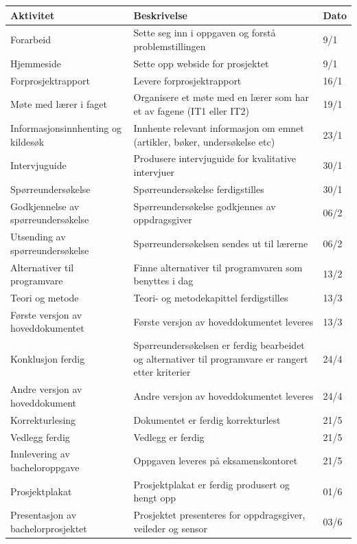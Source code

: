 \documentclass[norsk,a4paper,12pt]{article}
\begin{document}
\begin{center}
\begin{tabular}{ | m{5cm} | m{8cm}| m{1cm} | } 
 \hline
\textbf{Aktivitet} & \textbf{Beskrivelse} & \textbf{Dato} \\ 
\hline
Forarbeid & Sette seg inn i oppgaven og forstå problemstillingen & 9/1 \\ 
\hline
Hjemmeside & Sette opp webside for prosjektet & 9/1 \\ 
 \hline
Forprosjektrapport & Levere forprosjektrapport & 16/1 \\
\hline
Møte med lærer i faget & Organisere et møte med en lærer som har et av fagene (IT1 eller IT2) & 19/1 \\
\hline
Informasjonsinnhenting og kildesøk & Innhente relevant informasjon om emnet (artikler, bøker, undersøkelse etc) & 23/1 \\
\hline
Intervjuguide & Produsere intervjuguide for kvalitative intervjuer & 30/1 \\
\hline
Spørreundersøkelse & Spørreundersøkelse ferdigstilles & 30/1 \\
\hline
Godkjennelse av spørreundersøkelse & Spørreundersøkelse godkjennes av oppdragsgiver & 06/2 \\
\hline
Utsending av spørreundersøkelse & Spørreundersøkelsen sendes ut til lærerne & 06/2 \\
\hline
Alternativer til programvare & Finne alternativer til programvaren som benyttes i dag & 13/2 \\
\hline
Teori og metode & Teori- og metodekapittel ferdigstilles & 13/3 \\
\hline
Første versjon av hoveddokumentet & Første versjon av hoveddokumentet leveres & 13/3 \\
\hline
Konklusjon ferdig & Spørreundersøkelsen er ferdig bearbeidet og alternativer til programvare er rangert etter kriterier & 24/4 \\
\hline
Andre versjon av hoveddokument & Andre versjon av hoveddokumentet leveres & 24/4 \\
\hline
Korrekturlesing & Dokumentet er ferdig korrekturlest & 21/5 \\
\hline
Vedlegg ferdig & Vedlegg er ferdig & 21/5 \\
\hline
Innlevering av bacheloroppgave & Oppgaven leveres på eksamenskontoret & 21/5 \\
\hline
Prosjektplakat & Prosjektplakat er ferdig produsert og hengt opp & 01/6 \\
\hline
Presentasjon av bachelorprosjektet & Prosjektet presenteres for oppdragsgiver, veileder og sensor & 03/6 \\
\hline
\end{tabular}
\end{center}
\end{document}
